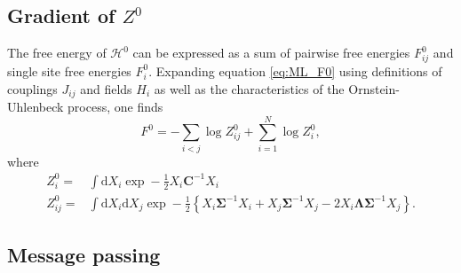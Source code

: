 \documentclass[10pt]{article}
\newcommand{\ddroit}{\textrm{d}}
\newcommand{\Lam}{\bm{\Lambda}}
\newcommand{\Sig}{\bm{\Sigma}}
\begin{document}

\subsection{Gradient of $Z^0$} %
\label{sub:gradient_of_z_0_}
The free energy of $\mathcal{H}^0$ can be expressed as a sum of pairwise free energies $F_{ij}^0$ and single site free energies $F_i^0$. Expanding equation \ref{eq:ML_F0} using definitions of couplings $J_{ij}$ and fields $H_i$ as well as the characteristics of the Ornstein-Uhlenbeck process, one finds 
\begin{equation}
  F^0 = -\sum_{i<j}\log{Z_{ij}^0} + \sum_{i=1}^N\log Z_i^0,
\end{equation}
where 
\begin{equation}
  \label{eq:ML_localZ0}
  \begin{split}
    Z_{i}^0 =& \int\ddroit X_i \exp-\frac{1}{2}X_i\bm{C}^{-1}X_i\\
    Z_{ij}^0 =& \int\ddroit X_i \ddroit X_j \exp-\frac{1}{2}\left\{ X_i\Sig^{-1}X_i + X_j\Sig^{-1}X_j - 2 X_i\Lam\Sig^{-1}X_j \right\}.
  \end{split}
\end{equation}



\subsection{Message passing} %
\label{sub:message_passing}
\end{document}
